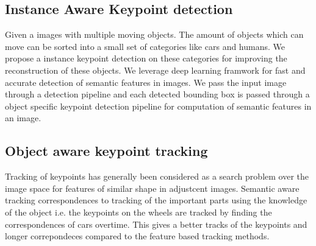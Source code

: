 \documentclass[10pt,twocolumn,letterpaper]{article}
\begin{document}
\subsection{Instance Aware Keypoint detection}
Given a images with multiple moving objects. The amount of objects which can move can be sorted into a small set of categories like cars and humans. We propose a instance keypoint detection on these categories for improving the reconstruction of these objects. We leverage deep learning framwork for fast and accurate detection of semantic features in images. We pass the input image through a detection pipeline and each detected bounding box is passed through a object specific keypoint detection pipeline for computation of semantic features in an image.  

\subsection{Object aware keypoint tracking}
Tracking of keypoints has generally been considered as a search problem over the image space for features of similar shape in adjustcent images. Semantic aware tracking correspondences to tracking of the important parts using the knowledge of the object i.e. the keypoints on the wheels are tracked by finding the correspondences of cars overtime. This gives a better tracks of the keypoints and longer correpondeces compared to the feature based tracking methods. 

{\small


}
\end{document}
